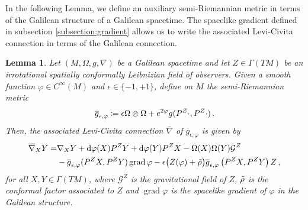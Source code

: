 \documentclass[12pt]{article}
\newcommand{\diff}{\mathrm{d}}
\newcommand{\coloneq}{\vcentcolon\mathrel{\mkern -1.2mu}\mathrel{=}}
\newcommand{\spacetime}{(M,\Omega,g,\nabla)}
\DeclareMathOperator{\grad}{grad}
\newtheorem{lem}[defi]{Lemma}
\begin{document}
In the following Lemma, we define an auxiliary  semi-Riemannian metric in terms of the Galilean structure of a Galilean spacetime. The spacelike gradient defined in subsection \ref{subsection:gradient} allows us to write the associated Levi-Civita connection in terms of the Galilean connection.
\begin{lem}\label{lem:Koszul}
    Let $\spacetime$ be a Galilean spacetime %
    and let $Z\in \Gamma(TM)$ be an irrotational spatially conformally Leibnizian field of observers. Given a smooth function $\varphi\in C^\infty(M)$ and $\epsilon\in \{-1,+1\}$, define on $M$ the semi-Riemannian metric
    \[
    \overline{g}_{\epsilon,\varphi} \coloneq \epsilon \Omega \otimes \Omega + e^{2\varphi} g(P^Z\cdot, P^Z \cdot)\,.
    \]
    Then, the associated Levi-Civita connection $\overline{\nabla}$ of $\overline{g}_{\epsilon,\varphi}$ is given by 
    \begin{equation}\label{eq:semi-Riemannian connection}
    \begin{aligned}
        \overline{\nabla}_X Y= & \nabla_X Y+\diff \varphi(X) P^Z Y+\diff \varphi(Y) P^Z X-\Omega(X) \Omega(Y) \mathcal{G}^Z \\
        & -\overline{g}_{\epsilon,\varphi}(P^Z X, P^Z Y) \grad \varphi - \epsilon\big(Z(\varphi)+\Tilde{\rho}\big) \overline{g}_{\epsilon, \varphi}\left(P^Z X, P^Z Y\right) Z\,,
    \end{aligned}
    \end{equation}
    for all $X,Y\in \Gamma(TM)$, where $\mathcal{G}^Z$ is the gravitational field of $Z$, $\Tilde{\rho}$ is the conformal factor associated to $Z$ and $\grad \varphi$ is the spacelike gradient of $\varphi$ in the Galilean structure. 
\end{lem}
\end{document}

